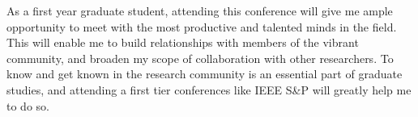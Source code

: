 \documentclass[11pt,a4paper,notitlepage]{article}
\begin{document}
As a first year graduate student, attending this conference will give
me ample opportunity to meet with the most productive and talented
minds in the field. This will enable me to build relationships with
members of the vibrant community, and broaden my scope of
collaboration with other researchers.  To know and get known in the
research community is an essential part of graduate studies, and
attending a first tier conferences like IEEE S\&P will greatly help me
to do so.
\end{document}
